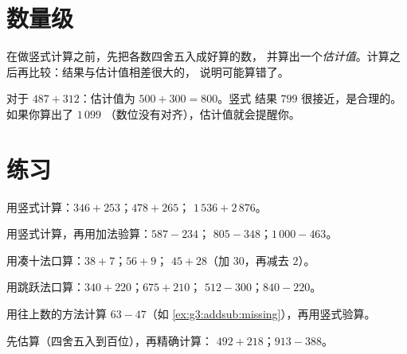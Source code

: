 \section{数量级}

\begin{method}[先估算再计算]\label{met:g3:addsub:estimate}
在做竖式计算之前，先把各数四舍五入成好算的数，
并算出一个\emph{估计值}。计算之后再比较：结果与估计值相差很大的，
说明可能算错了。
\end{method}

\begin{example}
对于 $487 + 312$：估计值为 $500 + 300 = 800$。竖式
结果 $799$ 很接近，是合理的。如果你算出了 $1\,099$
（数位没有对齐），估计值就会提醒你。
\end{example}

\section{练习}

\begin{exercise}[$\star$]\label{exo:g3:addsub:1}
用竖式计算：$346 + 253$；\quad $478 + 265$；\quad
$1\,536 + 2\,876$。
\end{exercise}

\begin{exercise}[$\star$]\label{exo:g3:addsub:2}
用竖式计算，再用加法验算：$587 - 234$；\quad
$805 - 348$；\quad $1\,000 - 463$。
\end{exercise}

\begin{exercise}[$\star$]\label{exo:g3:addsub:3}
用凑十法口算：$38 + 7$；\quad $56 + 9$；\quad
$45 + 28$（加 $30$，再减去 $2$）。
\end{exercise}

\begin{exercise}[$\star$]\label{exo:g3:addsub:4}
用跳跃法口算：$340 + 220$；\quad $675 + 210$；\quad
$512 - 300$；\quad $840 - 220$。
\end{exercise}

\begin{exercise}[$\star$]\label{exo:g3:addsub:5}
用往上数的方法计算 $63 - 47$（如
\cref{ex:g3:addsub:missing}），再用竖式验算。
\end{exercise}

\begin{exercise}[$\star$]\label{exo:g3:addsub:6}
先估算（四舍五入到百位），再精确计算：
$492 + 218$；\quad $913 - 388$。
\end{exercise}


